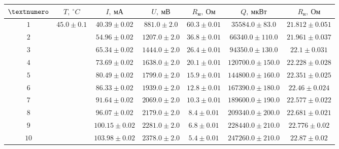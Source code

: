 \begin{tabular}{|c|c|c|c|c|c|c|}
  \hline
  $\textnumero$ & $T,\ ^\circ C$ & $I,\ мА$ & $U,\ мВ$ & $R_м,\ Ом$ & $Q,\ мкВт$ & $R_н,\ Ом$ \\ \hline
  $1$ & \multirow{10}{*}{$45.0 \pm 0.1$} & $40.39 \pm 0.02$ & $881.0 \pm 2.0$ & $60.3 \pm 0.01$ & $35584.0 \pm 83.0$ & $21.812 \pm 0.051$ \\ \cline{1-1} \cline{3-7}
  $2$ & & $54.96 \pm 0.02$ & $1207.0 \pm 2.0$ & $36.8 \pm 0.01$ & $66340.0 \pm 110.0$ & $21.961 \pm 0.037$ \\ \cline{1-1} \cline{3-7}
  $3$ & & $65.34 \pm 0.02$ & $1444.0 \pm 2.0$ & $26.4 \pm 0.01$ & $94350.0 \pm 130.0$ & $22.1 \pm 0.031$ \\ \cline{1-1} \cline{3-7}
  $4$ & & $73.69 \pm 0.02$ & $1638.0 \pm 2.0$ & $20.1 \pm 0.01$ & $120700.0 \pm 150.0$ & $22.228 \pm 0.028$ \\ \cline{1-1} \cline{3-7}
  $5$ & & $80.49 \pm 0.02$ & $1799.0 \pm 2.0$ & $15.9 \pm 0.01$ & $144800.0 \pm 160.0$ & $22.351 \pm 0.025$ \\ \cline{1-1} \cline{3-7}
  $6$ & & $86.33 \pm 0.02$ & $1939.0 \pm 2.0$ & $12.8 \pm 0.01$ & $167390.0 \pm 180.0$ & $22.46 \pm 0.024$ \\ \cline{1-1} \cline{3-7}
  $7$ & & $91.64 \pm 0.02$ & $2069.0 \pm 2.0$ & $10.3 \pm 0.01$ & $189600.0 \pm 190.0$ & $22.577 \pm 0.022$ \\ \cline{1-1} \cline{3-7}
  $8$ & & $96.07 \pm 0.02$ & $2179.0 \pm 2.0$ & $8.4 \pm 0.01$ & $209340.0 \pm 200.0$ & $22.681 \pm 0.021$ \\ \cline{1-1} \cline{3-7}
  $9$ & & $100.15 \pm 0.02$ & $2281.0 \pm 2.0$ & $6.8 \pm 0.01$ & $228440.0 \pm 210.0$ & $22.776 \pm 0.02$ \\ \cline{1-1} \cline{3-7}
  $10$ & & $103.98 \pm 0.02$ & $2378.0 \pm 2.0$ & $5.4 \pm 0.01$ & $247260.0 \pm 210.0$ & $22.87 \pm 0.02$ \\ \hline
\end{tabular}